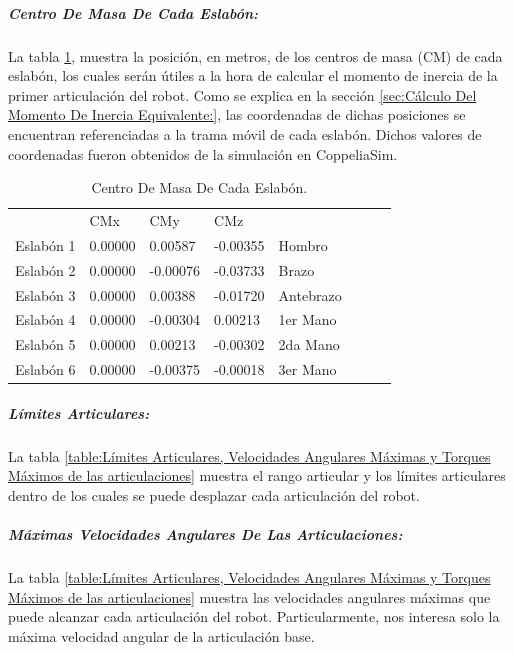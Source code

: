 \documentclass{article}
\begin{document}
\begin{sloppypar}
\subparagraph{Centro De Masa De Cada Eslabón:}
\label{sec:Centro De Masa De Cada Eslabón:}
\hfill \break
La tabla \ref{table:Centro De Masa De Cada Eslabón}, muestra la posición, en metros, de los centros de masa (CM) de cada eslabón, los cuales serán útiles a la hora de calcular el momento de inercia de la primer articulación del robot. Como se explica en la sección \ref{sec:Cálculo Del Momento De Inercia Equivalente:}, las coordenadas de dichas posiciones se encuentran referenciadas a la trama móvil de cada eslabón. Dichos valores de coordenadas fueron obtenidos de la simulación en CoppeliaSim.
\begin{table}[H]
\begin{center}
\begin{tabular}{l|lll|lll|l}
\cline{2-4}
          & CMx     & CMy      & CMz      &              \\ \cline{2-4}
Eslabón 1 & 0.00000 &  0.00587 & -0.00355 & Hombro       \\
Eslabón 2 & 0.00000 & -0.00076 & -0.03733 & Brazo        \\
Eslabón 3 & 0.00000 &  0.00388 & -0.01720 & Antebrazo    \\
Eslabón 4 & 0.00000 & -0.00304 &  0.00213 & 1er Mano  \\
Eslabón 5 & 0.00000 &  0.00213 & -0.00302 & 2da Mano \\
Eslabón 6 & 0.00000 & -0.00375 & -0.00018 & 3er Mano  \\ \cline{2-4}
\end{tabular}
\caption{\label{table:Centro De Masa De Cada Eslabón}Centro De Masa De Cada Eslabón.}
\end{center}
\end{table}


\subparagraph{Límites Articulares:}
\label{sec:Límites Articulares:}
\hfill \break
La tabla \ref{table:Límites Articulares, Velocidades Angulares Máximas y Torques Máximos de las articulaciones} muestra el rango articular y los límites articulares dentro de los cuales se puede desplazar cada articulación del robot.

\subparagraph{Máximas Velocidades Angulares De Las Articulaciones:}
\label{sec:Máximas Velocidades Angulares De Las Articulaciones:}
\hfill \break
La tabla \ref{table:Límites Articulares, Velocidades Angulares Máximas y Torques Máximos de las articulaciones} muestra las velocidades angulares máximas que puede alcanzar cada articulación del robot. Particularmente, nos interesa solo la máxima velocidad angular de la articulación base.


\end{sloppypar}
\end{document}
